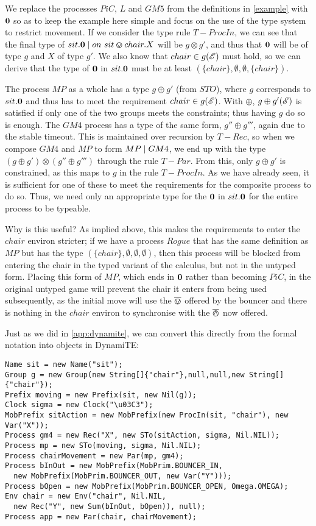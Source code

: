 \noindent We replace the processes $PiC$, $L$ and $GM5$ from the
definitions in \ref{example} with $\textbf{0}$ so as to keep the example
here simple and focus on the use of the type system to restrict
movement.  If we consider the type rule $T-ProcIn$, we can see that the
final type of $sit.\textbf{0} \;|\; on\ sit \varovee chair.X$ will be $g \otimes
g'$, and thus that $\textbf{0}$ will be of type $g$ and $X$ of type $g'$.
We also know that $chair \in g(\mathscr{E})$ must hold, so we can derive
that the type of $\textbf{0}$ in $sit.\textbf{0}$ must be at least $(\{chair\},
\emptyset, \emptyset, \{chair\})$.

The process $MP$ as a whole has a type $g \oplus g'$ (from $STO$),
where $g$ corresponds to $sit.\textbf{0}$ and thus has to meet the
requirement $chair \in g(\mathscr{E})$.  With $\oplus$, $g \oplus
  g'(\mathscr{E})$ is satisfied if only one of the two groups meets the
constraints; thus having $g$ do so is enough.  The $GM4$ process has a
type of the same form, $g'' \oplus g'''$, again due to the stable
timeout.  This is maintained over recursion by $T-Rec$, so when we
compose $GM4$ and $MP$ to form $MP \;|\; GM4$, we end up with the type
$(g \oplus g') \otimes (g'' \oplus g''')$ through the rule $T-Par$.
From this, only $g \oplus g'$ is constrained, as this maps to $g$ in
the rule $T-ProcIn$.  As we have already seen, it is sufficient for
one of these to meet the requirements for the composite process to do
so.  Thus, we need only an appropriate type for the $\textbf{0}$ in
$sit.\textbf{0}$ for the entire process to be typeable.

Why is this useful? As implied above, this makes the requirements to
enter the $chair$ environ stricter; if we have a process $Rogue$ that
has the same definition as $MP$ but has the type
$(\{chair\},\emptyset,\emptyset,\emptyset)$, then this process will be
blocked from entering the chair in the typed variant of the calculus,
but not in the untyped form.  Placing this form of $MP$, which ends in
$\textbf{0}$ rather than becoming $PiC$, in the original untyped game will
prevent the chair it enters from being used subsequently, as the
initial move will use the $\overline{\varovee}$ offered by the bouncer and there is
nothing in the $chair$ environ to synchronise with the $\overline{\varowedge}$ now
offered.

Just as we did in \ref{app:dynamite}, we can convert this directly
from the formal notation into objects in DynamiTE:

\begin{verbatim}
Name sit = new Name("sit");
Group g = new Group(new String[]{"chair"},null,null,new String[]{"chair"}); 
Prefix moving = new Prefix(sit, new Nil(g));
Clock sigma = new Clock("\u03C3");
MobPrefix sitAction = new MobPrefix(new ProcIn(sit, "chair"), new Var("X"));
Process gm4 = new Rec("X", new STo(sitAction, sigma, Nil.NIL));
Process mp = new STo(moving, sigma, Nil.NIL);
Process chairMovement = new Par(mp, gm4);
Process bInOut = new MobPrefix(MobPrim.BOUNCER_IN,
  new MobPrefix(MobPrim.BOUNCER_OUT, new Var("Y")));
Process bOpen = new MobPrefix(MobPrim.BOUNCER_OPEN, Omega.OMEGA);
Env chair = new Env("chair", Nil.NIL,
  new Rec("Y", new Sum(bInOut, bOpen)), null);
Process app = new Par(chair, chairMovement);
\end{verbatim} 

